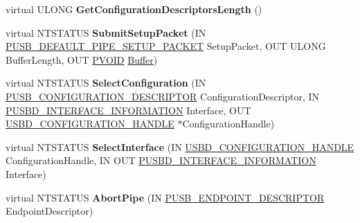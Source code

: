 \begin{DoxyCompactItemize}
\item 
\mbox{\label{class_c_u_s_b_device_ae32ef8c72c0449ee953cbe407afa4361}} 
virtual U\+L\+O\+NG {\bfseries Get\+Configuration\+Descriptors\+Length} ()
\item 
\mbox{\label{class_c_u_s_b_device_a618485a797a68d9eca74b8a0dc954f2f}} 
virtual N\+T\+S\+T\+A\+T\+US {\bfseries Submit\+Setup\+Packet} (IN \hyperlink{struct___u_s_b___d_e_f_a_u_l_t___p_i_p_e___s_e_t_u_p___p_a_c_k_e_t}{P\+U\+S\+B\+\_\+\+D\+E\+F\+A\+U\+L\+T\+\_\+\+P\+I\+P\+E\+\_\+\+S\+E\+T\+U\+P\+\_\+\+P\+A\+C\+K\+ET} Setup\+Packet, O\+UT U\+L\+O\+NG Buffer\+Length, O\+UT \hyperlink{interfacevoid}{P\+V\+O\+ID} \hyperlink{class_buffer}{Buffer})
\item 
\mbox{\label{class_c_u_s_b_device_a587bda3ae273f0288515a0a584b79477}} 
virtual N\+T\+S\+T\+A\+T\+US {\bfseries Select\+Configuration} (IN \hyperlink{struct___u_s_b___c_o_n_f_i_g_u_r_a_t_i_o_n___d_e_s_c_r_i_p_t_o_r}{P\+U\+S\+B\+\_\+\+C\+O\+N\+F\+I\+G\+U\+R\+A\+T\+I\+O\+N\+\_\+\+D\+E\+S\+C\+R\+I\+P\+T\+OR} Configuration\+Descriptor, IN \hyperlink{struct___u_s_b_d___i_n_t_e_r_f_a_c_e___i_n_f_o_r_m_a_t_i_o_n}{P\+U\+S\+B\+D\+\_\+\+I\+N\+T\+E\+R\+F\+A\+C\+E\+\_\+\+I\+N\+F\+O\+R\+M\+A\+T\+I\+ON} Interface, O\+UT \hyperlink{interfacevoid}{U\+S\+B\+D\+\_\+\+C\+O\+N\+F\+I\+G\+U\+R\+A\+T\+I\+O\+N\+\_\+\+H\+A\+N\+D\+LE} $\ast$Configuration\+Handle)
\item 
\mbox{\label{class_c_u_s_b_device_a6d64868572cd16799a25ceeb8c3c60df}} 
virtual N\+T\+S\+T\+A\+T\+US {\bfseries Select\+Interface} (IN \hyperlink{interfacevoid}{U\+S\+B\+D\+\_\+\+C\+O\+N\+F\+I\+G\+U\+R\+A\+T\+I\+O\+N\+\_\+\+H\+A\+N\+D\+LE} Configuration\+Handle, IN O\+UT \hyperlink{struct___u_s_b_d___i_n_t_e_r_f_a_c_e___i_n_f_o_r_m_a_t_i_o_n}{P\+U\+S\+B\+D\+\_\+\+I\+N\+T\+E\+R\+F\+A\+C\+E\+\_\+\+I\+N\+F\+O\+R\+M\+A\+T\+I\+ON} Interface)
\item 
\mbox{\label{class_c_u_s_b_device_aa16c1bdf129a7101f65cc085ef658fce}} 
virtual N\+T\+S\+T\+A\+T\+US {\bfseries Abort\+Pipe} (IN \hyperlink{struct___u_s_b___e_n_d_p_o_i_n_t___d_e_s_c_r_i_p_t_o_r}{P\+U\+S\+B\+\_\+\+E\+N\+D\+P\+O\+I\+N\+T\+\_\+\+D\+E\+S\+C\+R\+I\+P\+T\+OR} Endpoint\+Descriptor)
\item 
\mbox{\label{class_c_u_s_b_device_a47f00f5589d2323c021ad2439d44780d}} 

\end{DoxyCompactItemize}
